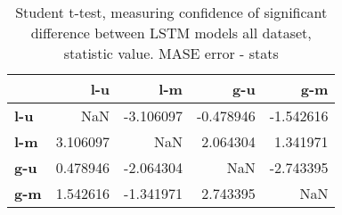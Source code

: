 \begin{table}[H]
\centering
\caption{Student t-test, measuring confidence of significant difference between LSTM models all dataset, statistic value. MASE error - stats}
\label{table:ttest-stats-lstm-experiments-MASE-all-datasets}
\begin{tabular}{lrrrr}
\toprule
{} &       l-u &       l-m &       g-u &       g-m \\
\midrule
\textbf{l-u} &       NaN & -3.106097 & -0.478946 & -1.542616 \\
\textbf{l-m} &  3.106097 &       NaN &  2.064304 &  1.341971 \\
\textbf{g-u} &  0.478946 & -2.064304 &       NaN & -2.743395 \\
\textbf{g-m} &  1.542616 & -1.341971 &  2.743395 &       NaN \\
\bottomrule
\end{tabular}
\end{table}
